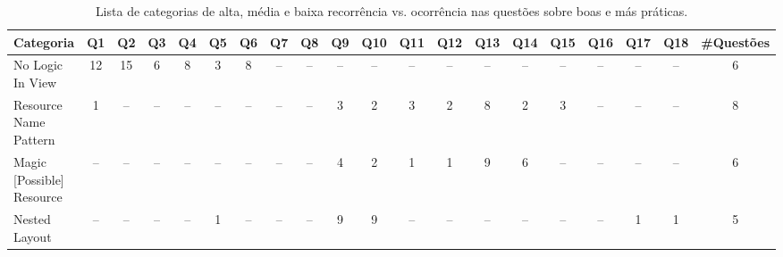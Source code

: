 \begin{table*}[t]
\centering
\caption{Lista de categorias de alta, m\'edia e baixa recorr\^encia vs. ocorr\^encia nas quest\~oes sobre boas e m\'as pr\'aticas.}
\footnotesize
\begin{tabular}{@{}p{4cm}|p{.2cm}p{.2cm}p{.2cm}p{.2cm}p{.2cm}p{.2cm}p{.2cm}p{.2cm}p{.2cm}p{.4cm}p{.4cm}p{.4cm}p{.4cm}p{.4cm}p{.4cm}p{.4cm}p{.4cm}p{.4cm}|p{1.5cm}@{}}
\toprule
\textbf{Categoria} & Q1 & Q2 & Q3 & Q4 & Q5 & Q6 & Q7 & Q8 & Q9 & Q10 & Q11 & Q12 & Q13 & Q14 & Q15 & Q16 & Q17 & Q18 &  \textbf{\#Quest\~oes} \\
\hline
No Logic In View							& \multicolumn{1}{c}{12}	& \multicolumn{1}{c}{15}	& \multicolumn{1}{c}{6}	& \multicolumn{1}{c}{8}	& \multicolumn{1}{c}{3}	& \multicolumn{1}{c}{8}	& \multicolumn{1}{c}{--}	& \multicolumn{1}{c}{--}	& \multicolumn{1}{c}{--}	& \multicolumn{1}{c}{--}	& \multicolumn{1}{c}{--}	& \multicolumn{1}{c}{--}	& \multicolumn{1}{c}{--}	& \multicolumn{1}{c}{--}	& \multicolumn{1}{c}{--}	& \multicolumn{1}{c}{--}	& \multicolumn{1}{c}{--}	& \multicolumn{1}{c}{--} & \multicolumn{1}{|c}{6} \\
Resource Name Pattern						& \multicolumn{1}{c}{1}		& \multicolumn{1}{c}{--}		& \multicolumn{1}{c}{--}	& \multicolumn{1}{c}{--}	& \multicolumn{1}{c}{--}	& \multicolumn{1}{c}{--}	& \multicolumn{1}{c}{--}	& \multicolumn{1}{c}{--}	& \multicolumn{1}{c}{3}	& \multicolumn{1}{c}{2}	& \multicolumn{1}{c}{3}	& \multicolumn{1}{c}{2}	& \multicolumn{1}{c}{8}	& \multicolumn{1}{c}{2}	& \multicolumn{1}{c}{3}	& \multicolumn{1}{c}{--}	& \multicolumn{1}{c}{--}	& \multicolumn{1}{c}{--} 		& \multicolumn{1}{|c}{8} \\
Magic [Possible] Resource					& \multicolumn{1}{c}{--}		& \multicolumn{1}{c}{--}		& \multicolumn{1}{c}{--}	& \multicolumn{1}{c}{--}	& \multicolumn{1}{c}{--}	& \multicolumn{1}{c}{--}	& \multicolumn{1}{c}{--}	& \multicolumn{1}{c}{--}	& \multicolumn{1}{c}{4}	& \multicolumn{1}{c}{2}	& \multicolumn{1}{c}{1}	& \multicolumn{1}{c}{1}	& \multicolumn{1}{c}{9}	& \multicolumn{1}{c}{6}	& \multicolumn{1}{c}{--}	& \multicolumn{1}{c}{--}	& \multicolumn{1}{c}{--}	& \multicolumn{1}{c}{--} 		& \multicolumn{1}{|c}{6} \\
Nested Layout								& \multicolumn{1}{c}{--}		& \multicolumn{1}{c}{--}		& \multicolumn{1}{c}{--}	& \multicolumn{1}{c}{--}	& \multicolumn{1}{c}{1}	& \multicolumn{1}{c}{--}	& \multicolumn{1}{c}{--}	& \multicolumn{1}{c}{--}	& \multicolumn{1}{c}{9}	& \multicolumn{1}{c}{9}	& \multicolumn{1}{c}{--}	& \multicolumn{1}{c}{--}	& \multicolumn{1}{c}{--}	& \multicolumn{1}{c}{--}	& \multicolumn{1}{c}{--}	& \multicolumn{1}{c}{--}	& \multicolumn{1}{c}{1}	& \multicolumn{1}{c}{1} 		& \multicolumn{1}{|c}{5} \\

\end{tabular}
\end{table*}
